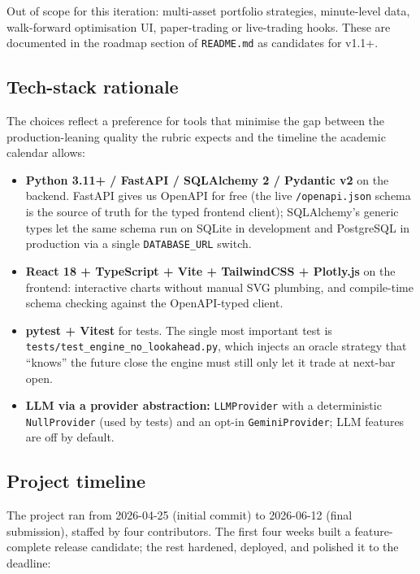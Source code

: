 Out of scope for this iteration: multi-asset portfolio strategies, minute-level data,
walk-forward optimisation UI, paper-trading or live-trading hooks. These are
documented in the roadmap section of \texttt{README.md} as candidates for v1.1+.

\subsection{Tech-stack rationale}

The choices reflect a preference for tools that minimise the gap between the
production-leaning quality the rubric expects and the timeline the
academic calendar allows:

\begin{itemize}
  \item \textbf{Python 3.11+ / FastAPI / SQLAlchemy 2 / Pydantic v2} on the backend.
        FastAPI gives us OpenAPI for free (the live \texttt{/openapi.json} schema is
        the source of truth for the typed frontend client); SQLAlchemy's generic
        types let the same schema run on SQLite in development and PostgreSQL in
        production via a single \texttt{DATABASE\_URL} switch.
  \item \textbf{React 18 + TypeScript + Vite + TailwindCSS + Plotly.js} on the
        frontend: interactive charts without manual SVG plumbing, and compile-time
        schema checking against the OpenAPI-typed client.
  \item \textbf{pytest + Vitest} for tests. The single most important test is
        \texttt{tests/test\_engine\_no\_lookahead.py}, which injects an oracle
        strategy that ``knows'' the future close \textemdash{} the engine must still
        only let it trade at next-bar open.
  \item \textbf{LLM via a provider abstraction:} \texttt{LLMProvider} with a
        deterministic \texttt{NullProvider} (used by tests) and an opt-in
        \texttt{GeminiProvider}; LLM features are off by default.
\end{itemize}

\subsection{Project timeline}

The project ran from 2026-04-25 (initial commit) to 2026-06-12 (final submission),
staffed by four contributors. The first four weeks built a feature-complete
release candidate; the rest hardened, deployed, and polished it to the deadline:

